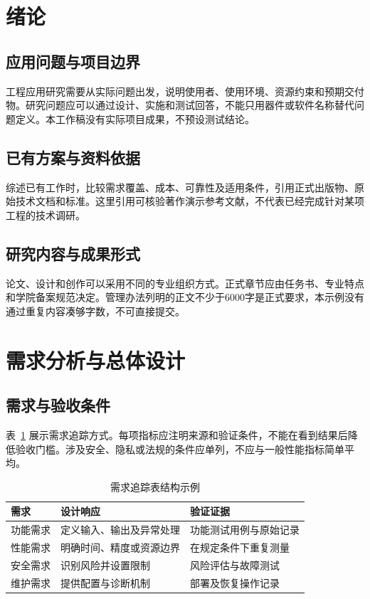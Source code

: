 \section{绪论}
\subsection{应用问题与项目边界}
工程应用研究需要从实际问题出发，说明使用者、使用环境、资源约束和预期交付物。研究问题应可以通过设计、实施和测试回答，不能只用器件或软件名称替代问题定义。本工作稿没有实际项目成果，不预设测试结论。
\subsection{已有方案与资料依据}
综述已有工作时，比较需求覆盖、成本、可靠性及适用条件，引用正式出版物、原始技术文档和标准。这里引用可核验著作演示参考文献\cite{zhou2016,lamport1994}，不代表已经完成针对某项工程的技术调研。
\subsection{研究内容与成果形式}
论文、设计和创作可以采用不同的专业组织方式。正式章节应由任务书、专业特点和学院备案规范决定。管理办法列明的正文不少于6000字是正式要求，本示例没有通过重复内容凑够字数，不可直接提交。
\clearpage\section{需求分析与总体设计}
\subsection{需求与验收条件}
表~\ref{tab:trace} 展示需求追踪方式。每项指标应注明来源和验证条件，不能在看到结果后降低验收门槛。涉及安全、隐私或法规的条件应单列，不应与一般性能指标简单平均。
\begin{table}[htbp]\centering\caption{需求追踪表结构示例}\label{tab:trace}
\begin{tabularx}{\linewidth}{lXX}\toprule 需求 & 设计响应 & 验证证据\\\midrule
功能需求 & 定义输入、输出及异常处理 & 功能测试用例与原始记录\\
性能需求 & 明确时间、精度或资源边界 & 在规定条件下重复测量\\
安全需求 & 识别风险并设置限制 & 风险评估与故障测试\\
维护需求 & 提供配置与诊断机制 & 部署及恢复操作记录\\\bottomrule\end{tabularx}
\end{table}
